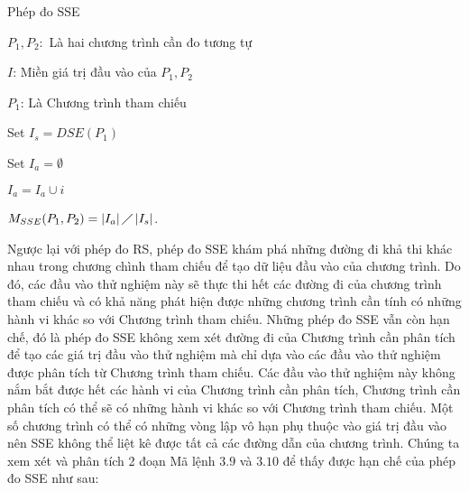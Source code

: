 \begin{algorithm}[H]
	\caption{Phép đo SSE}
	\begin{algorithmic}	
		\item $P_{1}, P_{2}:$ Là hai chương trình cần đo tương tự
		\item $I$: Miền giá trị đầu vào của $P_{1}, P_{2}$
		\item $P_{1}$: Là Chương trình tham chiếu
		\item Set $I_{s} = DSE(P_{1})$ 
		\item Set $I_{a} = \emptyset$ 
		  
		
		\State $I_{a} = I_{a} \cup i$		
		\EndIf
		\EndWhile
		\item $M_{SSE}(P_{1}, P_{2}) = \left|I_{a}\right| \diagup \left|I_{s}\right| $. 
	\end{algorithmic}
\end{algorithm}

Ngược lại với phép đo RS, phép đo SSE khám phá những đường đi khả thi khác nhau trong chương chình tham chiếu để tạo dữ liệu đầu vào của chương trình. Do đó, các đầu vào thử nghiệm này sẽ thực thi hết các đường đi của chương trình tham chiếu và có khả năng phát hiện được những chương trình cần tính có những hành vi khác so với Chương trình tham chiếu. Những phép đo SSE vẫn còn hạn chế, đó là phép đo SSE không xem xét đường đi của Chương trình cần phân tích để tạo các giá trị đầu vào thử nghiệm mà chỉ dựa vào các đầu vào thử nghiệm được phân tích từ Chương trình tham chiếu. Các đầu vào thử nghiệm này không nắm bắt được hết các hành vi của Chương trình cần phân tích, Chương trình cần phân tích có thể sẽ có những hành vi khác so với Chương trình tham chiếu. Một số chương trình có thể có những vòng lập vô hạn phụ thuộc vào giá trị đầu vào nên SSE không thể liệt kê được tất cả các đường dẫn của chương trình. Chúng ta xem xét và phân tích 2 đoạn Mã lệnh $3.9$ và $3.10$ để thấy được hạn chế của phép đo SSE như sau:

\begin{minipage}[t]{0.45\linewidth}
	
\end{minipage}%
\hfill\vrule\hfill
\begin{minipage}[t]{0.45\linewidth}
	
\end{minipage}%

